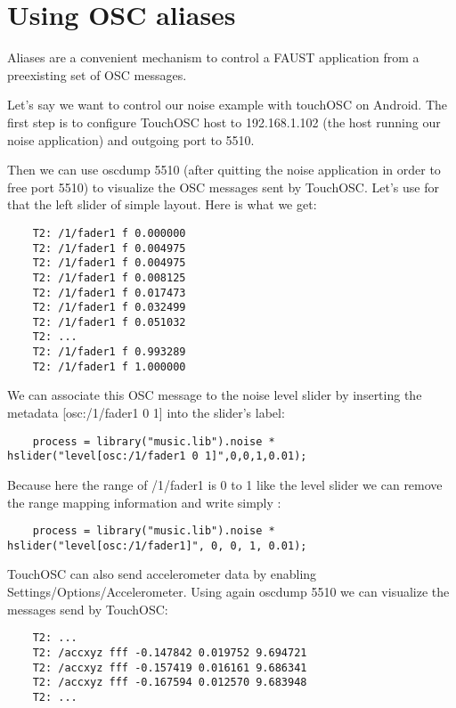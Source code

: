 \section{Using OSC aliases}

Aliases are a convenient mechanism to control a FAUST application from a preexisting set of OSC messages. 

Let's say we want to control our noise example with touchOSC on Android. The first step is to configure TouchOSC host to 192.168.1.102 (the host running our noise application) and outgoing port to 5510. 

Then we can use oscdump 5510 (after quitting the noise application in order to free port 5510) to visualize the OSC messages sent by TouchOSC. Let's use for that the left slider of simple layout. Here is what we get:

\begin{lstlisting}
	T2: /1/fader1 f 0.000000
	T2: /1/fader1 f 0.004975
	T2: /1/fader1 f 0.004975
	T2: /1/fader1 f 0.008125
	T2: /1/fader1 f 0.017473
	T2: /1/fader1 f 0.032499
	T2: /1/fader1 f 0.051032
	T2: ...
	T2: /1/fader1 f 0.993289
	T2: /1/fader1 f 1.000000
\end{lstlisting}

We can associate this OSC message to the noise level slider by inserting the metadata [osc:/1/fader1 0 1] into the slider's label:

\begin{lstlisting}
	process = library("music.lib").noise * hslider("level[osc:/1/fader1 0 1]",0,0,1,0.01);
\end{lstlisting}
	
Because here the range of /1/fader1 is 0 to 1 like the level slider we can remove the range mapping information and write simply :

\begin{lstlisting}
	process = library("music.lib").noise * hslider("level[osc:/1/fader1]", 0, 0, 1, 0.01);
\end{lstlisting}
	
TouchOSC can also send accelerometer data by enabling Settings/Options/Accelerometer. Using again oscdump 5510 we can visualize the messages send by TouchOSC:

\begin{lstlisting}
	T2: ...
	T2: /accxyz fff -0.147842 0.019752 9.694721
	T2: /accxyz fff -0.157419 0.016161 9.686341
	T2: /accxyz fff -0.167594 0.012570 9.683948
	T2: ...
\end{lstlisting}


